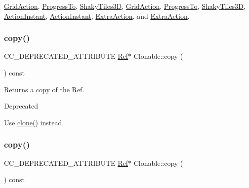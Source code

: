 \hyperlink{classGridAction_a081a9340e9289cf2dcbb6bde121d4f24}{Grid\+Action}, \hyperlink{classProgressTo_a993bf559112f3bbe3f4d38027711fd8e}{Progress\+To}, \hyperlink{classShakyTiles3D_aefe37a5cda9d6898ad9c573e5a220ce1}{Shaky\+Tiles3D}, \hyperlink{classGridAction_a081a9340e9289cf2dcbb6bde121d4f24}{Grid\+Action}, \hyperlink{classProgressTo_a55a418dbd387fca470d425df87291b0b}{Progress\+To}, \hyperlink{classShakyTiles3D_ad83d154be5494000eb8fcfe657e503ff}{Shaky\+Tiles3D}, \hyperlink{classActionInstant_adb76fc6f006098109e8256210cbd8cc0}{Action\+Instant}, \hyperlink{classActionInstant_adb76fc6f006098109e8256210cbd8cc0}{Action\+Instant}, \hyperlink{classExtraAction_ab934c199930dec4d3bff42d61ce940da}{Extra\+Action}, and \hyperlink{classExtraAction_a758a349952071ad00b74ddf34cfa9b2a}{Extra\+Action}.

\mbox{\label{classClonable_a5fd8dad9fd4321a1372423892e16dad8}} 
\subsubsection{\texorpdfstring{copy()}{copy()}\hspace{0.1cm}{\footnotesize\ttfamily [1/2]}}
{\footnotesize\ttfamily C\+C\+\_\+\+D\+E\+P\+R\+E\+C\+A\+T\+E\+D\+\_\+\+A\+T\+T\+R\+I\+B\+U\+TE \hyperlink{classRef}{Ref}$\ast$ Clonable\+::copy (\begin{DoxyParamCaption}{ }\end{DoxyParamCaption}) const\hspace{0.3cm}{\ttfamily [inline]}}

Returns a copy of the \hyperlink{classRef}{Ref}. \begin{DoxyRefDesc}{Deprecated}
\item[\hyperlink{deprecated__deprecated000053}{Deprecated}]Use \hyperlink{classClonable_a36b05a0fa605f4f269e5884bde7f9e0c}{clone()} instead. \end{DoxyRefDesc}
\mbox{\label{classClonable_a5fd8dad9fd4321a1372423892e16dad8}} 
\subsubsection{\texorpdfstring{copy()}{copy()}\hspace{0.1cm}{\footnotesize\ttfamily [2/2]}}
{\footnotesize\ttfamily C\+C\+\_\+\+D\+E\+P\+R\+E\+C\+A\+T\+E\+D\+\_\+\+A\+T\+T\+R\+I\+B\+U\+TE \hyperlink{classRef}{Ref}$\ast$ Clonable\+::copy (\begin{DoxyParamCaption}{ }\end{DoxyParamCaption}) const\hspace{0.3cm}{\ttfamily [inline]}}

